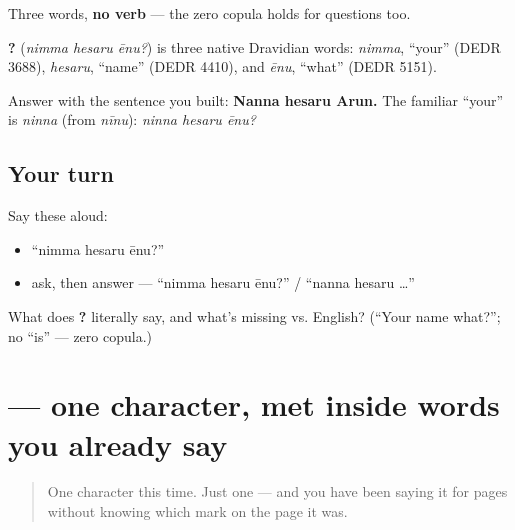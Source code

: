 Three words, \textbf{no verb} — the zero copula holds for questions too.

\begin{cousinweb}
\textbf{  ?} (\emph{nimma hesaru ēnu?}) is three native Dravidian words: \emph{nimma}, \textquotedblleft{}your\textquotedblright{} (DEDR 3688), \emph{hesaru}, \textquotedblleft{}name\textquotedblright{} (DEDR 4410), and \emph{ēnu}, \textquotedblleft{}what\textquotedblright{} (DEDR 5151).
\end{cousinweb}

\begin{grammarlens}[title={Grammar Lens: answer, and the familiar version}]
Answer with the sentence you built: \textbf{Nanna hesaru Arun.} The familiar \textquotedblleft{}your\textquotedblright{} is \emph{ninna} (from \emph{nīnu}): \emph{ninna hesaru ēnu?}
\end{grammarlens}

\subsection*{Your turn}
Say these aloud:

\begin{itemize}
\raggedright
  \item \textquotedblleft{}nimma hesaru ēnu?\textquotedblright{}
  \item ask, then answer — \textquotedblleft{}nimma hesaru ēnu?\textquotedblright{} / \textquotedblleft{}nanna hesaru …\textquotedblright{}
\end{itemize}

\begin{tcolorbox}[breakable,colback=teal!4,colframe=teal!35!black,title={Before you move on}]
What does \textbf{  ?} literally say, and what's missing vs. English? (\textquotedblleft{}Your name what?\textquotedblright{}; no \textquotedblleft{}is\textquotedblright{} — zero copula.)
\end{tcolorbox}
\section[\texorpdfstring{\kn{ೆ} (e)}{ೆ (e)}]{ — one character, met inside words you already say}

\label{lesson:KA-S111-vowel-sign-e}



\begin{quote}
One character this time. Just one — and you have been saying it for pages without knowing which mark on the page it was.
\end{quote}

